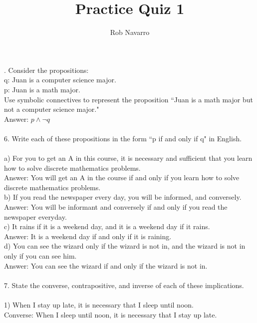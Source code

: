 \documentclass[11pt, oneside]{article}   	%
\title{Practice Quiz 1}
\author{Rob Navarro}
\begin{document}
\maketitle

. Consider the propositions:\\
q: Juan is a computer science major.\\
p: Juan is a math major.\\
Use symbolic connectives to represent the proposition ``Juan is a math major but not a computer science major."\\
Answer: $p\wedge\neg q$\\\\
6. Write each of these propositions in the form ``p if and only if q" in
English.\\\\
a) For you to get an A in this course, it is necessary and sufficient
that you learn how to solve discrete mathematics problems.\\
Answer: You will get an A in the course if and only if you learn how to solve discrete mathematics problems.\\
b) If you read the newspaper every day, you will be informed, and conversely.\\
Answer: You will be informant and conversely if and only if you read the newspaper everyday.\\
c) It rains if it is a weekend day, and it is a weekend day if it rains.\\
Answer: It is a weekend day if and only if it is raining.\\
d) You can see the wizard only if the wizard is not in, and the wizard is not in only if you can see him.\\
Answer: You can see the wizard if and only if the wizard is not in. \\\\
7. State the converse, contrapositive, and inverse of each of these implications.\\\\
1) When I stay up late, it is necessary that I sleep until noon.\\
Converse: When I sleep until noon, it is necessary that I stay up late.\\
\end{document}
